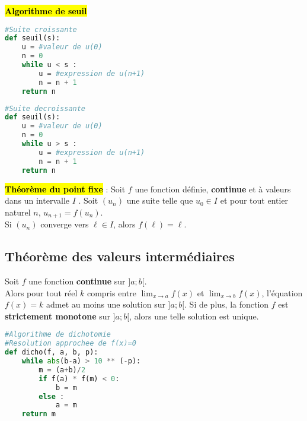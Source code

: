 \documentclass[10pt,fleqn, openany, landscape, twocolumn]{book} %
\begin{document}
\hl{\textbf{Algorithme de seuil}}\\
\begin{minipage}{0.45 \linewidth}
\begin{lstlisting}[language=python]
#Suite croissante
def seuil(s):
	u = #valeur de u(0)
	n = 0
	while u < s :
		u = #expression de u(n+1)
		n = n + 1
	return n
\end{lstlisting}
\end{minipage}\hfill\begin{minipage}{0.45 \linewidth}
\begin{lstlisting}[language=python]
#Suite decroissante
def seuil(s):
	u = #valeur de u(0)
	n = 0
	while u > s :
		u = #expression de u(n+1)
		n = n + 1
	return n
\end{lstlisting}
\end{minipage}

\hl{\textbf{Théorème du point fixe}} : Soit $f$ une fonction définie, \textbf{continue} et à valeurs dans un intervalle $I$ . Soit $(u_n)$ une suite telle que $u_0 \in I$ et pour tout entier naturel $n$, $u_{n+1}=f(u_n)$. \\ Si $(u_n)$ converge vers $\ell \in I$, alors $f(\ell)=\ell$.


\subsection*{Théorème des valeurs intermédiaires}
\begin{minipage}{0.5\linewidth}
Soit $f$ une fonction \textbf{continue} sur $]a;b[$.\\ Alors pour tout réel $k$ compris entre $\displaystyle\lim_{x \to a}f(x)$ et $\displaystyle\lim_{x \to b}f(x)$, l'équation $f(x)=k$ admet au moins une solution sur $]a;b[$.
\vskip5pt
Si de plus, la fonction $f$ est \textbf{strictement monotone} sur $]a;b[$, alors une telle solution est unique.\end{minipage}\hfill\begin{minipage}{0.45\linewidth}
\begin{lstlisting}[language = python]
#Algorithme de dichotomie
#Resolution approchee de f(x)=0
def dicho(f, a, b, p):
	while abs(b-a) > 10 ** (-p):
		m = (a+b)/2
		if f(a) * f(m) < 0:
			b = m
		else :
			a = m
	return m
\end{lstlisting}
\end{minipage}
\end{document}

